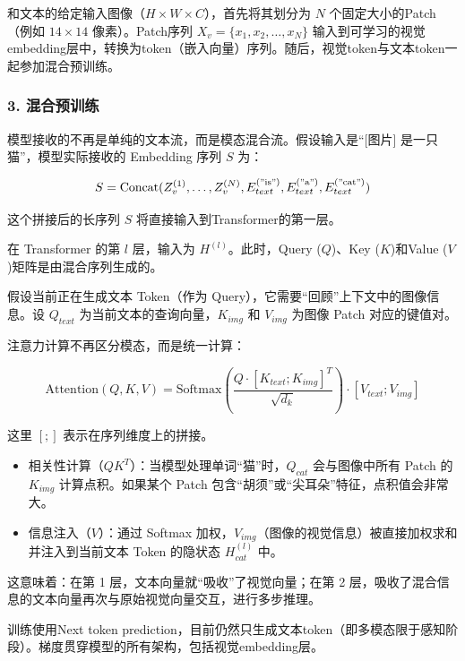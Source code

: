 和文本的给定输入图像（\(H\times W\times C\)），首先将其划分为 \(N\) 个固定大小的Patch（例如 \(14\times14\) 像素）。Patch序列 \(X_v=\{x_1,x_2,\ldots,x_N\}\) 输入到可学习的视觉embedding层中，转换为token（嵌入向量）序列。随后，视觉token与文本token一起参加混合预训练。

\hypertarget{ux6df7ux5408ux9884ux8badux7ec3}{%
\subsubsection{3. 混合预训练}\label{ux6df7ux5408ux9884ux8badux7ec3}}

模型接收的不再是单纯的文本流，而是模态混合流。假设输入是``{[}图片{]} 是一只猫''，模型实际接收的 Embedding 序列 \(S\) 为：

\[
S=\mathrm{Concat}(Z_v^{(1)},\ldots,Z_v^{(N)},E_{text}^{(\mathrm{"is"})},E_{text}^{(\mathrm{"a"})},E_{text}^{(\mathrm{"cat"})})
\]

这个拼接后的长序列 \(S\) 将直接输入到Transformer的第一层。

在 Transformer 的第 \(l\) 层，输入为 \(H^{(l)}\)。此时，Query (\(Q\))、Key (\(K\))和Value (\(V\))矩阵是由混合序列生成的。

假设当前正在生成文本 Token（作为 Query），它需要``回顾''上下文中的图像信息。设 \(Q_{text}\) 为当前文本的查询向量，\(K_{img}\) 和 \(V_{img}\) 为图像 Patch 对应的键值对。

注意力计算不再区分模态，而是统一计算：

\[
\mathrm{Attention}(Q,K,V)=\mathrm{Softmax}\left(\frac{Q\cdot [K_{text};K_{img}]^T}{\sqrt{d_k}}\right)\cdot [V_{text};V_{img}]
\]

这里 \([;]\) 表示在序列维度上的拼接。

\begin{itemize}
\tightlist
\item
  相关性计算（\(QK^T\)）：当模型处理单词``猫''时，\(Q_{cat}\) 会与图像中所有 Patch 的 \(K_{img}\) 计算点积。如果某个 Patch 包含``胡须''或``尖耳朵''特征，点积值会非常大。
\item
  信息注入（\(V\)）：通过 Softmax 加权，\(V_{img}\)（图像的视觉信息）被直接加权求和并注入到当前文本 Token 的隐状态 \(H_{cat}^{(l)}\) 中。
\end{itemize}

这意味着：在第 1 层，文本向量就``吸收''了视觉向量；在第 2 层，吸收了混合信息的文本向量再次与原始视觉向量交互，进行多步推理。

训练使用Next token prediction，目前仍然只生成文本token（即多模态限于感知阶段）。梯度贯穿模型的所有架构，包括视觉embedding层。

